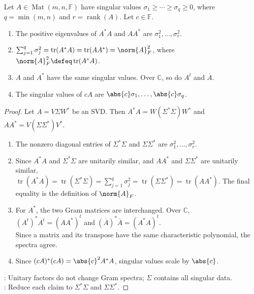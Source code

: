 \begin{proposition} \label{prop:basic-singular-value-identities} \\
Let $A\in\operatorname{Mat}(m,n,\mathbb{F})$ have singular values $\sigma_1\geq\cdots\geq\sigma_q\geq0$, where $q=\min(m,n)$ and $r=\operatorname{rank}(A)$. Let $c\in\mathbb{F}$.
\begin{enumerate}[label=(\roman*)]
\setlength{\itemsep}{0pt}
\item The positive eigenvalues of $A^*A$ and $AA^*$ are $\sigma_1^2,\ldots,\sigma_r^2$.
\item $\sum_{j=1}^{q}\sigma_j^2=\operatorname{tr}(A^*A)=\operatorname{tr}(AA^*)=\norm{A}_F^2$, where $\norm{A}_F^2\defeq\operatorname{tr}(A^*A)$.
\item $A$ and $A^*$ have the same singular values. Over $\mathbb{C}$, so do $A^t$ and $\overline{A}$.
\item The singular values of $cA$ are $\abs{c}\sigma_1,\ldots,\abs{c}\sigma_q$.
\end{enumerate}
\begin{proof}
Let $A=V\Sigma W^*$ be an SVD. Then $A^*A=W(\Sigma^*\Sigma)W^*$ and $AA^*=V(\Sigma\Sigma^*)V^*$.
\begin{enumerate}[label=(\roman*)]
\setlength{\itemsep}{0pt}
\item The nonzero diagonal entries of $\Sigma^*\Sigma$ and $\Sigma\Sigma^*$ are $\sigma_1^2,\ldots,\sigma_r^2$.
\item Since $A^*A$ and $\Sigma^*\Sigma$ are unitarily similar, and $AA^*$ and $\Sigma\Sigma^*$ are unitarily similar,\\
$\operatorname{tr}(A^*A)=\operatorname{tr}(\Sigma^*\Sigma)=\sum\limits_{j=1}^q\sigma_j^2 =\operatorname{tr}(\Sigma\Sigma^*)=\operatorname{tr}(AA^*)$. The final equality is the definition of $\norm{A}_F$.
\item For $A^*$, the two Gram matrices are interchanged. Over $\mathbb{C}$, $(A^t)^*A^t=(AA^*)^t$ and $(\overline{A})^*\overline{A}=(A^*A)^t$.\\
Since a matrix and its transpose have the same characteristic polynomial, the spectra agree.
\item Since $(cA)^*(cA)=\abs{c}^2A^*A$, singular values scale by $\abs{c}$.
\end{enumerate}
: Unitary factors do not change Gram spectra; $\Sigma$ contains all singular data.\\
: Reduce each claim to $\Sigma^*\Sigma$ and $\Sigma\Sigma^*$.
\end{proof}
\end{proposition}

